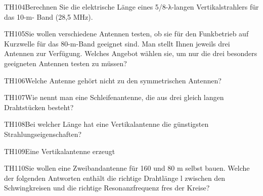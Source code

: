 \begin{question}{TH104}{Berechnen Sie die elektrische Länge eines 5/8-λ-langen Vertikalstrahlers für das 10-m- Band (28,5 MHz).}
\end{question}

\begin{question}{TH105}{Sie wollen verschiedene Antennen testen, ob sie für den Funkbetrieb auf Kurzwelle für das 80-m-Band geeignet sind. Man stellt Ihnen jeweils drei Antennen zur Verfügung. Welches Angebot wählen sie, um nur die drei besonders geeigneten Antennen testen zu müssen?}
\end{question}

\begin{question}{TH106}{Welche Antenne gehört nicht zu den symmetrischen Antennen?}
\end{question}

\begin{question}{TH107}{Wie nennt man eine Schleifenantenne, die aus drei gleich langen Drahtstücken besteht?}
\end{question}

\begin{question}{TH108}{Bei welcher Länge hat eine Vertikalantenne die günstigsten Strahlungseigenschaften?}
\end{question}

\begin{question}{TH109}{Eine Vertikalantenne erzeugt}
\end{question}

\begin{question}{TH110}{Sie wollen eine Zweibandantenne für 160 und 80 m selbst bauen. Welche der folgenden Antworten enthält die richtige Drahtlänge l zwischen den Schwingkreisen und die richtige Resonanzfrequenz fres der Kreise?}
\end{question}

